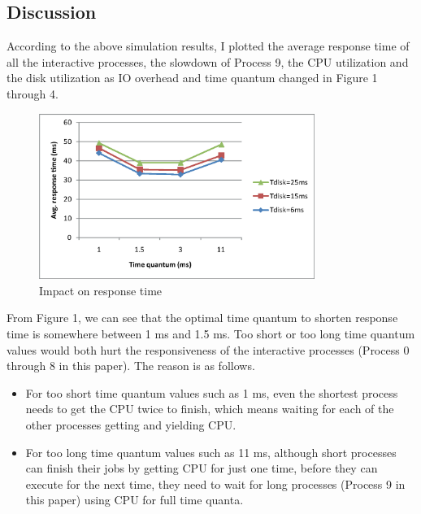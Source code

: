 \documentclass[12pt,letterpaper]{article}
\begin{document}
\subsection{Discussion}
According to the above simulation results, I plotted the average response time of all the interactive processes, the slowdown of Process 9, the CPU utilization and the disk utilization as IO overhead and time quantum changed in Figure 1 through 4.

\begin{figure}[h]
\begin{center}
\includegraphics[width=0.8\textwidth]{responseTime.eps}
\caption{Impact on response time}
\end{center}
\end{figure}

From Figure 1, we can see that the optimal time quantum to shorten response time is somewhere between 1 ms and 1.5 ms. Too short or too long time quantum values would both hurt the responsiveness of the interactive processes (Process 0 through 8 in this paper). The reason is as follows.

\begin{itemize}
\item For too short time quantum values such as 1 ms, even the shortest process needs to get the CPU twice to finish, which means waiting for each of the other processes getting and yielding CPU.
\item For too long time quantum values such as 11 ms, although short processes can finish their jobs by getting CPU for just one time, before they can execute for the next time, they need to wait for long processes (Process 9 in this paper) using CPU for full time quanta.
\end{itemize}
\end{document}
